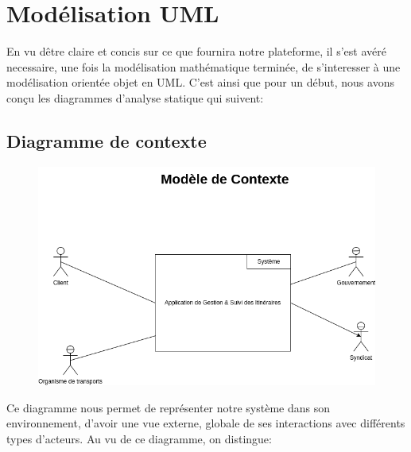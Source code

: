 \section{Modélisation UML}

En vu dêtre claire et concis sur ce que fournira notre plateforme, il s'est avéré necessaire, une fois la modélisation mathématique terminée, de s'interesser à une modélisation orientée objet en UML. C'est ainsi que pour un début, nous avons conçu les diagrammes d'analyse statique qui suivent:

\subsection{Diagramme de contexte}

\begin{figure}[h]
    \centering
    \includegraphics[width=0.8\linewidth]{Images/Diagramme_Contexte.png}
\end{figure}

Ce diagramme nous permet de représenter notre système dans son environnement, d'avoir une vue externe, globale de ses interactions avec différents types d'acteurs.
Au vu de ce diagramme, on distingue:

